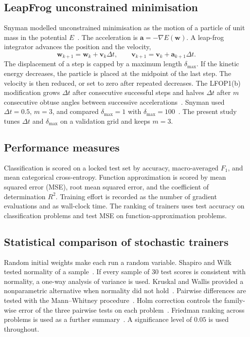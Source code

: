 \documentclass[conference,10pt]{IEEEtran}
\begin{document}
\subsection{LeapFrog unconstrained minimisation}
\label{sec:leap}
Snyman modelled unconstrained minimisation as the motion of a particle of unit mass in the potential $E$~\cite{snyman1982}.
The acceleration is $\mathbf{a}=-\nabla E(\mathbf{w})$.
A leap-frog integrator advances the position and the velocity,
\begin{equation}
\mathbf{w}_{k+1}=\mathbf{w}_{k}+\mathbf{v}_{k}\Delta t, \qquad
\mathbf{v}_{k+1}=\mathbf{v}_{k}+\mathbf{a}_{k+1}\Delta t.
\end{equation}
The displacement of a step is capped by a maximum length $\delta_{\max}$.
If the kinetic energy decreases, the particle is placed at the midpoint of the last step.
The velocity is then reduced, or set to zero after repeated decreases.
The LFOP1(b) modification grows $\Delta t$ after consecutive successful steps and halves $\Delta t$ after $m$ consecutive obtuse angles between successive accelerations~\cite{snyman1983}.
Snyman used $\Delta t=0.5$, $m=3$, and compared $\delta_{\max}=1$ with $\delta_{\max}=100$~\cite{snyman1983}.
The present study tunes $\Delta t$ and $\delta_{\max}$ on a validation grid and keeps $m=3$.

\subsection{Performance measures}
\label{sec:measures}
Classification is scored on a locked test set by accuracy, macro-averaged $F_{1}$, and mean categorical cross-entropy.
Function approximation is scored by mean squared error (MSE), root mean squared error, and the coefficient of determination $R^{2}$.
Training effort is recorded as the number of gradient evaluations and as wall-clock time.
The ranking of trainers uses test accuracy on classification problems and test MSE on function-approximation problems.

\subsection{Statistical comparison of stochastic trainers}
Random initial weights make each run a random variable.
Shapiro and Wilk tested normality of a sample~\cite{shapiro1965}.
If every sample of 30 test scores is consistent with normality, a one-way analysis of variance is used.
Kruskal and Wallis provided a nonparametric alternative when normality did not hold~\cite{kruskal1952}.
Pairwise differences are tested with the Mann--Whitney procedure~\cite{mann1947}.
Holm correction controls the family-wise error of the three pairwise tests on each problem~\cite{holm1979}.
Friedman ranking across problems is used as a further summary~\cite{friedman1937}.
A significance level of $0.05$ is used throughout.
\end{document}
